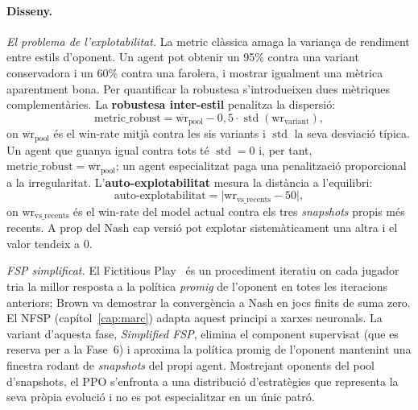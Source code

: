 \paragraph{Disseny.}

\emph{El problema de l'explotabilitat.} La \(\text{metric}\) clàssica amaga la variança
de rendiment entre estils d'oponent. Un agent pot obtenir un 95\% contra una variant
conservadora i un 60\% contra una farolera, i mostrar igualment una mètrica aparentment
bona. Per quantificar la robustesa s'introdueixen dues mètriques complementàries. La
\textbf{robustesa inter-estil} penalitza la dispersió:
\begin{equation}
  \text{metric\_robust} = \overline{\text{wr}}_{\text{pool}} - 0{,}5 \cdot
  \operatorname{std}(\text{wr}_{\text{variant}}),
  \label{eq:metric-robust}
\end{equation}
on \(\overline{\text{wr}}_{\text{pool}}\) és el win-rate mitjà contra les sis variants i
\(\operatorname{std}\) la seva desviació típica. Un agent que guanya igual contra tots
té \(\operatorname{std}=0\) i, per tant,
\(\text{metric\_robust} = \overline{\text{wr}}_{\text{pool}}\); un agent especialitzat
paga una penalització proporcional a la irregularitat. L'\textbf{auto-explotabilitat}
mesura la distància a l'equilibri:
\begin{equation}
  \text{auto-explotabilitat} = \lvert \text{wr}_{\text{vs\_recents}} - 50 \rvert,
  \label{eq:exploit-sp}
\end{equation}
on \(\text{wr}_{\text{vs\_recents}}\) és el win-rate del model actual contra els tres
\emph{snapshots} propis més recents. A prop del Nash cap versió pot explotar
sistemàticament una altra i el valor tendeix a 0.

\emph{\ac{FSP} simplificat.} El Fictitious
Play~\cite{brown1951fictitious} és un procediment iteratiu on cada jugador tria la millor
resposta a la política \emph{promig} de l'oponent en totes les iteracions anteriors; Brown
va demostrar la convergència a Nash en jocs finits de suma zero. El \ac{NFSP}
(capítol~\ref{cap:marc}) adapta aquest principi a xarxes neuronals. La variant d'aquesta
fase, \emph{Simplified \ac{FSP}}, elimina el component supervisat (que es reserva per a la
Fase~6) i aproxima la política promig de l'oponent mantenint una finestra rodant de
\emph{snapshots} del propi agent. Mostrejant oponents del pool d'snapshots, el PPO
s'enfronta a una distribució d'estratègies que representa la seva pròpia evolució
i no es pot especialitzar en un únic patró.


